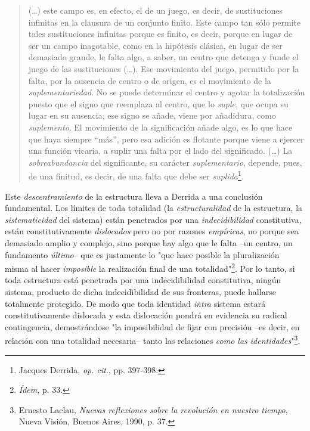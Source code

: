 \documentclass{book}
\begin{document}
\begin{quote}
(\dots) este campo es, en efecto, el de un juego, es decir, de
sustituciones infinitas en la clausura de un conjunto finito. Este campo
tan sólo permite tales sustituciones infinitas porque es finito, es
decir, porque en lugar de ser un campo inagotable, como en la hipótesis
clásica, en lugar de ser demasiado grande, le falta algo, a saber, un
centro que detenga y funde el juego de las sustituciones (\dots).
Ese movimiento del juego, permitido por la falta, por la ausencia de
centro o de origen, es el movimiento de la \emph{suplementariedad}. No
se puede determinar el centro y agotar la totalización puesto que el
signo que reemplaza al centro, que lo \emph{suple}, que ocupa su lugar
en su ausencia, ese signo se añade, viene por añadidura, como
\emph{suplemento}. El movimiento de la significación añade algo, es lo
que hace que haya siempre ``más'', pero esa adición es flotante porque
viene a ejercer una función vicaria, a suplir una falta por el lado del
significado. (\dots) La \emph{sobreabundancia} del significante, su
carácter \emph{suplementario}, depende, pues, de una finitud, es decir,
de una falta que debe ser \emph{suplida}\footnote{Jacques Derrida,
  \emph{op. cit}., pp. 397-398.}.
\end{quote}

Este \emph{descentramiento} de la estructura lleva a Derrida a una
conclusión fundamental. Los límites de toda totalidad (la
\emph{estructuralidad} de la estructura, la \emph{sistematicidad} del
sistema) están penetrados por una \emph{indecidibilidad} constitutiva,
están constitutivamente \emph{dislocados} pero no por razones
\emph{empíricas}, no porque sea demasiado amplio y complejo, sino porque
hay algo que le falta --un centro, un fundamento \emph{último}-- que es
justamente lo "que hace posible la pluralización misma al hacer
\emph{imposible} la realización final de una totalidad"\footnote{\emph{Ídem},
  p. 33.}. Por lo tanto, si toda estructura está penetrada por una
indecidibilidad constitutiva, ningún sistema, producto de dicha
indecidibilidad de sus fronteras, puede hallarse totalmente protegido.
De modo que toda identidad \emph{intra} sistema estará constitutivamente
dislocada y esta dislocación pondrá en evidencia su radical
contingencia, demostrándose "la imposibilidad de fijar con precisión
--es decir, en relación con una totalidad necesaria-- tanto las
relaciones \emph{como las identidades}"\footnote{Ernesto Laclau,
  \emph{Nuevas reflexiones sobre la revolución en nuestro tiempo}, Nueva
  Visión, Buenos Aires, 1990, p. 37.}.
\end{document}
